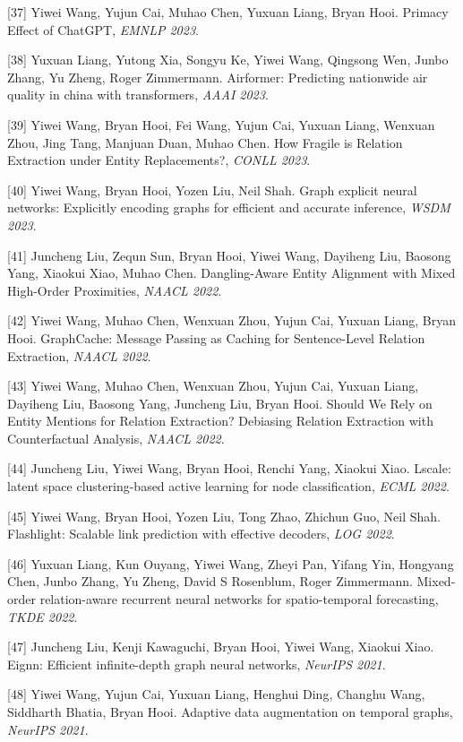 [37] Yiwei Wang, Yujun Cai, Muhao Chen, Yuxuan Liang, Bryan Hooi. Primacy Effect of ChatGPT, \textit{EMNLP 2023}.

[38] Yuxuan Liang, Yutong Xia, Songyu Ke, Yiwei Wang, Qingsong Wen, Junbo Zhang, Yu Zheng, Roger Zimmermann. Airformer: Predicting nationwide air quality in china with transformers, \textit{AAAI 2023}.

[39] Yiwei Wang, Bryan Hooi, Fei Wang, Yujun Cai, Yuxuan Liang, Wenxuan Zhou, Jing Tang, Manjuan Duan, Muhao Chen. How Fragile is Relation Extraction under Entity Replacements?, \textit{CONLL 2023}.

[40] Yiwei Wang, Bryan Hooi, Yozen Liu, Neil Shah. Graph explicit neural networks: Explicitly encoding graphs for efficient and accurate inference, \textit{WSDM 2023}.

[41] Juncheng Liu, Zequn Sun, Bryan Hooi, Yiwei Wang, Dayiheng Liu, Baosong Yang, Xiaokui Xiao, Muhao Chen. Dangling-Aware Entity Alignment with Mixed High-Order Proximities, \textit{NAACL 2022}.

[42] Yiwei Wang, Muhao Chen, Wenxuan Zhou, Yujun Cai, Yuxuan Liang, Bryan Hooi. GraphCache: Message Passing as Caching for Sentence-Level Relation Extraction, \textit{NAACL 2022}.

[43] Yiwei Wang, Muhao Chen, Wenxuan Zhou, Yujun Cai, Yuxuan Liang, Dayiheng Liu, Baosong Yang, Juncheng Liu, Bryan Hooi. Should We Rely on Entity Mentions for Relation Extraction? Debiasing Relation Extraction with Counterfactual Analysis, \textit{NAACL 2022}.

[44] Juncheng Liu, Yiwei Wang, Bryan Hooi, Renchi Yang, Xiaokui Xiao. Lscale: latent space clustering-based active learning for node classification, \textit{ECML 2022}.

[45] Yiwei Wang, Bryan Hooi, Yozen Liu, Tong Zhao, Zhichun Guo, Neil Shah. Flashlight: Scalable link prediction with effective decoders, \textit{LOG 2022}.

[46] Yuxuan Liang, Kun Ouyang, Yiwei Wang, Zheyi Pan, Yifang Yin, Hongyang Chen, Junbo Zhang, Yu Zheng, David S Rosenblum, Roger Zimmermann. Mixed-order relation-aware recurrent neural networks for spatio-temporal forecasting, \textit{TKDE 2022}.

[47] Juncheng Liu, Kenji Kawaguchi, Bryan Hooi, Yiwei Wang, Xiaokui Xiao. Eignn: Efficient infinite-depth graph neural networks, \textit{NeurIPS 2021}.

[48] Yiwei Wang, Yujun Cai, Yuxuan Liang, Henghui Ding, Changhu Wang, Siddharth Bhatia, Bryan Hooi. Adaptive data augmentation on temporal graphs, \textit{NeurIPS 2021}.

